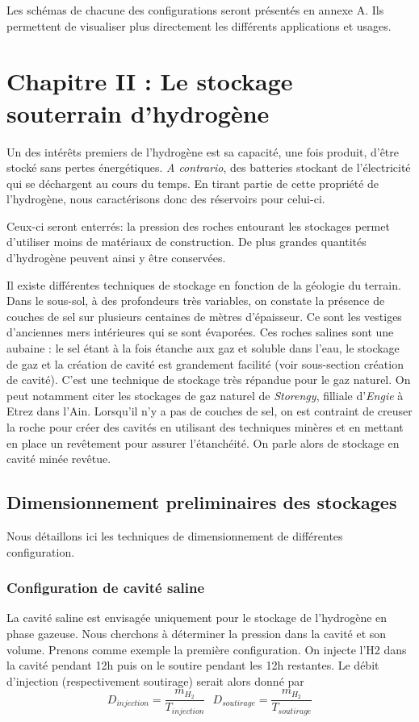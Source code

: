 \documentclass[11pt,french,a4paper]{article}
\begin{document}
Les schémas de chacune des configurations seront présentés en annexe A. Ils permettent de visualiser plus directement les différents applications et usages.











\section{Chapitre II : Le stockage souterrain d'hydrogène}
Un des intérêts premiers de l'hydrogène est sa capacité, une fois produit, d'être stocké sans pertes énergétiques. \textit{A contrario}, des batteries stockant de l'électricité qui se déchargent au cours du temps. En tirant partie de cette propriété de l'hydrogène, nous caractérisons donc des réservoirs pour celui-ci. 

Ceux-ci seront enterrés: la pression des roches entourant les stockages permet d'utiliser moins de matériaux de construction. De plus grandes quantités d'hydrogène peuvent ainsi y être conservées.

Il existe différentes techniques de stockage en fonction de la géologie du terrain. Dans le sous-sol, à des profondeurs très variables, on constate la présence de couches de sel sur plusieurs centaines de mètres d'épaisseur. Ce sont les vestiges d'anciennes mers intérieures qui se sont évaporées. Ces roches salines sont une aubaine : le sel étant à la fois étanche aux gaz et soluble dans l'eau, le stockage de gaz et la création de cavité est grandement facilité (voir sous-section création de cavité). C'est une technique de stockage très répandue pour le gaz naturel. On peut notamment citer les stockages de gaz naturel de \emph{Storengy}, filliale d'\emph{Engie} à Etrez dans l'Ain. Lorsqu'il n'y a pas de couches de sel, on est contraint de creuser la roche pour créer des cavités en utilisant des techniques minères et en mettant en place un revêtement pour assurer l'étanchéité. On parle alors de stockage en cavité minée revêtue.


\subsection{Dimensionnement preliminaires des stockages}
Nous détaillons ici les techniques de dimensionnement de différentes configuration.
\subsubsection{Configuration de cavité saline}
La cavité saline est envisagée uniquement pour le stockage de l'hydrogène en phase gazeuse. Nous cherchons à déterminer la pression dans la cavité et son volume. Prenons comme exemple la première configuration. On injecte l’H2 dans la cavité pendant 12h puis on le soutire pendant les 12h restantes. Le débit d’injection (respectivement soutirage) serait alors donné par $$ D_{injection}=\frac{m_{H_2}}{T_{injection}} \ \ \  D_{soutirage}=\frac{m_{H_2}}{T_{soutirage}} $$
\end{document}
